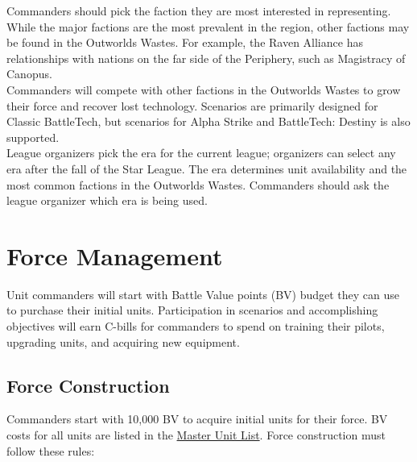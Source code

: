 \documentclass[UTF8]{article}
\begin{document}
Commanders should pick the faction they are most interested in representing.
While the major factions are the most prevalent in the region, other factions may be found in the Outworlds Wastes.
For example, the Raven Alliance has relationships with nations on the far side of the Periphery, such as Magistracy of Canopus.\\

Commanders will compete with other factions in the Outworlds Wastes to grow their force and recover lost technology.
Scenarios are primarily designed for Classic BattleTech, but scenarios for Alpha Strike and BattleTech: Destiny is also supported.\\

League organizers pick the era for the current league; organizers can select any era after the fall of the Star League.
The era determines unit availability and the most common factions in the Outworlds Wastes.
Commanders should ask the league organizer which era is being used.\\

\newpage

\section{Force Management}

Unit commanders will start with Battle Value points (BV) budget they can use to purchase their initial units.
Participation in scenarios and accomplishing objectives will earn C-bills for commanders to spend on training their pilots, upgrading units, and acquiring new equipment.

\subsection{Force Construction}

Commanders start with 10,000 BV to acquire initial units for their force.
BV costs for all units are listed in the \href{http://www.masterunitlist.info}{Master Unit List}.
Force construction must follow these rules:\\
\end{document}
